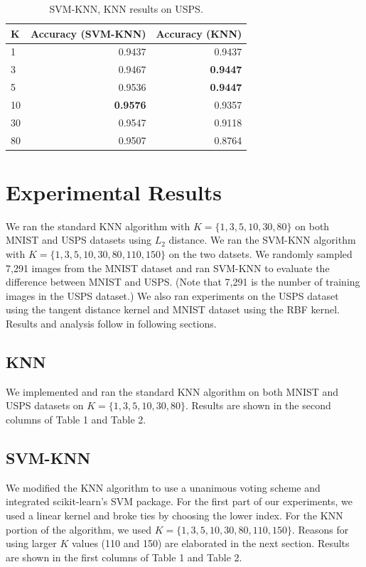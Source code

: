\documentclass[11pt,letterpaper]{article}
\begin{document}
\begin{table}
\begin{center}
\begin{tabular}{|l|r|r|}
\hline \bf K & \bf Accuracy (SVM-KNN) & \bf Accuracy (KNN)\\ \hline
1 & 0.9437 & 0.9437\\
3 & 0.9467 & \textbf{0.9447}\\
5 & 0.9536 & \textbf{0.9447}\\
10 & \textbf{0.9576} & 0.9357\\
30 & 0.9547 & 0.9118\\
80 & 0.9507 & 0.8764\\
\hline
\end{tabular}
\end{center}
\caption{\label{knn-mnist} SVM-KNN, KNN results on USPS. }
\end{table}

\section{Experimental Results}

We ran the standard KNN algorithm with $K=\{1,3,5,10,30,80\}$ on both MNIST and USPS datasets using $L_2$ distance. We ran the SVM-KNN algorithm with $K=\{1,3,5,10,30,80,110,150\}$ on the two datsets. We randomly sampled 7,291 images from the MNIST dataset and ran SVM-KNN to evaluate the difference between MNIST and USPS. (Note that 7,291 is the number of training images in the USPS dataset.) We also ran experiments on the USPS dataset using the tangent distance kernel and MNIST dataset using the RBF kernel. Results and analysis follow in following sections.

\subsection{KNN}

We implemented and ran the standard KNN algorithm on both MNIST and USPS datasets on $K=\{1,3,5,10,30,80\}$. Results are shown in the second columns of Table 1 and Table 2.

\subsection{SVM-KNN}

We modified the KNN algorithm to use a unanimous voting scheme and integrated scikit-learn's SVM package. For the first part of our experiments, we used a linear kernel and broke ties by choosing the lower index. For the KNN portion of the algorithm, we used $K=\{1,3,5,10,30,80,110,150\}$. Reasons for using larger $K$ values (110 and 150) are elaborated in the next section. Results are shown in the first columns of Table 1 and Table 2.
\end{document}
